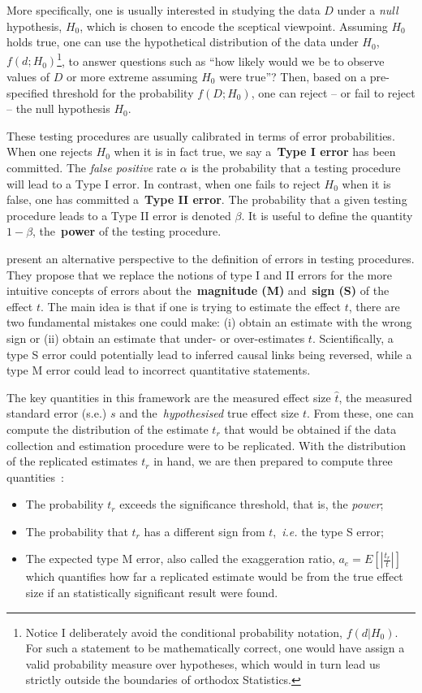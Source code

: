 More specifically, one is usually interested in studying the data $D$ under a \textit{null} hypothesis, $H_0$, which is chosen to encode the sceptical viewpoint.
Assuming $H_0$ holds true, one can use the hypothetical distribution of the data under $H_0$, $f(d; H_0)$\footnote{Notice I deliberately avoid the conditional probability notation, $f(d|H_0)$. For such a statement to be mathematically correct, one would have assign a valid probability measure over hypotheses, which would in turn lead us strictly outside the boundaries of orthodox Statistics.}, to answer questions such as ``how likely would we be to observe values of $D$ or more extreme assuming $H_0$ were true''?
Then, based on a pre-specified threshold for the probability $f(D; H_0)$, one can reject -- or fail to reject --  the null hypothesis $H_0$.

These testing procedures are usually calibrated in terms of error probabilities.
When one rejects $H_0$ when it is in fact true, we say a~\textbf{Type I error}  has been committed.
The \textit{false positive} rate $\alpha$ is the probability that a testing procedure will lead to a Type I error.
In contrast, when one fails to reject $H_0$ when it is false, one has committed a~\textbf{Type II error}.
The probability that a given testing procedure leads to a Type II error is denoted $\beta$.
It is useful to define the quantity $1-\beta$, the~\textbf{power} of the testing procedure.

\cite{Gelman2014} present an alternative perspective to the definition of errors in testing procedures.
They propose that we replace the notions of type I and II errors for the more intuitive concepts of errors about the~\textbf{magnitude (M)} and~\textbf{sign (S)} of the effect $t$.
The main idea is that if one is trying to estimate the effect $t$, there are two fundamental mistakes one could make: (i) obtain an estimate with the wrong sign or (ii) obtain an estimate that under- or over-estimates $t$.
Scientifically, a type S error could potentially lead to inferred causal links being reversed, while a type M error could lead to incorrect quantitative statements.

The key quantities in this framework are the measured effect size $\hat{t}$, the measured standard error (s.e.) $s$ and the~\textit{hypothesised} true effect size $t$.
From these, one can compute the distribution of the estimate $t_r$  that would be  obtained if the data collection and estimation procedure were to be replicated. 
With the distribution of the replicated estimates $t_r$ in hand, we are then prepared to compute three quantities~\citep{Gelman2014}:
\begin{itemize}
 \item The probability $t_r$ exceeds the significance threshold, that is, the \textit{power};
 \item The probability that $t_r$ has a different sign from $t$,~\textit{i.e.} the type S error;
 \item The expected type M error, also called the exaggeration ratio, $a_e = E[|\frac{t_r}{t}|]$ which quantifies how far a replicated estimate would be from the true effect size if an statistically significant result were found. 
\end{itemize}

